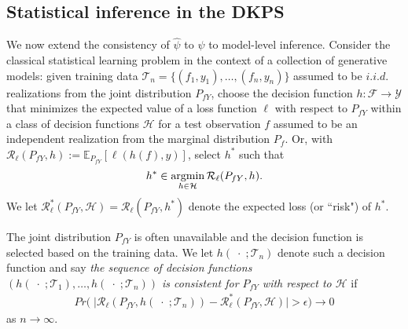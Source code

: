 

\subsection{Statistical inference in the DKPS}
\label{subsec:inference}

We now extend the consistency of $ \widehat{\psi} $ to $ \psi $ to model-level inference.
Consider the classical statistical learning problem \citep[Chapter~2]{hastie2009elements} in the context of a collection of generative models: given training data $ \mathcal{T}_{n} = \{ (f_{1}, y_{1}), \hdots, (f_{n}, y_{n}) \} $ assumed to be  $ i.i.d. $ realizations from the joint distribution $ P_{f Y} $, choose the decision function $ h: \mathcal{F} \to \mathcal{Y} $ that minimizes the expected value of a loss function $ \ell $ with respect to $ P_{f Y} $ within a class of decision functions $ \mathcal{H} $ for a test observation $ f $ assumed to be an independent realization from the marginal distribution $ P_{f}$. 
Or, with $ \mathcal{R}_{\ell}(P_{f Y}, h) := \mathbb{E}_{P_{f Y}}\left[\ell(h(f), y)\right] $, select $ h^* $ such that 
\begin{align*}
\label{eq:risk}
    h^* \in \argmin_{h \in \mathcal{H}} \mathcal{R}_{\ell}(P_{f Y}, h). 
\end{align*}
We let $ \mathcal{R}_{\ell}^{*}(P_{f Y}, \mathcal{H})=
\mathcal{R}_{\ell}(P_{f Y}, h^*)
$ denote the expected loss (or ``risk") of $ h^* $. 

The joint distribution $ P_{f Y} $ is often unavailable and the decision function is selected based on the training data. 
We let $ h(\; \cdot \;; \mathcal{T}_{n}) $ denote such a decision function and say \textit{the sequence of decision functions $ \left(h(\; \cdot \;; \mathcal{T}_{1}), \hdots, h(\;\cdot\;; \mathcal{T}_{n})\right) $ is consistent for $ P_{f Y} $ with respect to $ \mathcal{H}$} if \begin{align*}
Pr\big(\;\big|  \mathcal{R}_{\ell}(P_{f Y}, h(\;\cdot\;; \mathcal{T}_{n})) - \mathcal{R}^{*}_{\ell}(P_{f Y}, \mathcal{H}) \big| > \epsilon\big) \to 0
\end{align*} as $ n \to \infty $.

